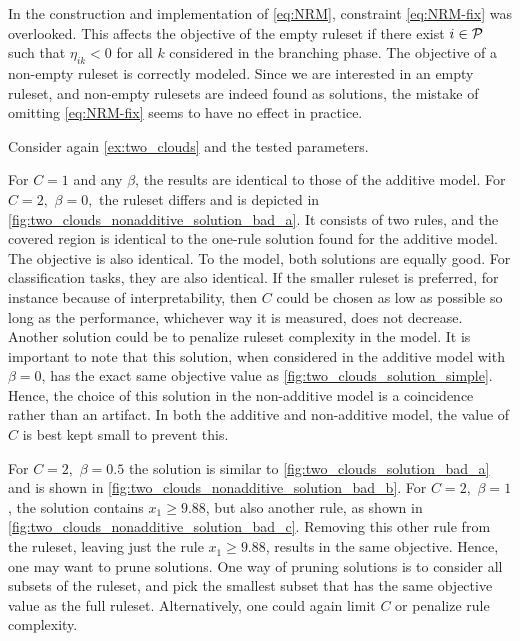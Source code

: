 \begin{note}
    In the construction and implementation of \eqref{eq:NRM}, constraint \eqref{eq:NRM-fix} was overlooked.
    This affects the objective of the empty ruleset if there exist $i \in \P$ such that $\eta_{ik} < 0$ for all
    $k$ considered in the branching phase.
    The objective of a non-empty ruleset is correctly modeled.
    Since we are interested in an empty ruleset, and non-empty rulesets are indeed found as solutions,
    the mistake of omitting \eqref{eq:NRM-fix} seems to have no effect in practice.
\end{note}

\begin{example}\label{ex:two_clouds_nonadditive}
    Consider again \autoref{ex:two_clouds} and the tested parameters.

    For $C=1$ and any $\beta$, the results are identical to those of the additive model.
    For $C=2,$ $\beta=0,$ the ruleset differs and is depicted in \autoref{fig:two_clouds_nonadditive_solution_bad_a}.
    It consists of two rules, and the covered region is identical to the one-rule solution found for the additive model.
    The objective is also identical.
    To the model, both solutions are equally good.
    For classification tasks, they are also identical.
    If the smaller ruleset is preferred, for instance because of interpretability, then $C$ could be chosen as low as possible so long as the performance,
    whichever way it is measured, does not decrease.
    Another solution could be to penalize ruleset complexity in the model.
    It is important to note that this solution, when considered in the additive model with $\beta =0$,
    has the exact same objective value as \autoref{fig:two_clouds_solution_simple}.
    Hence, the choice of this solution in the non-additive model is a coincidence rather than an artifact.
    In both the additive and non-additive model, the value of $C$ is best kept small to prevent this.

    For $C=2,$ $\beta=0.5$ the solution is similar to \autoref{fig:two_clouds_solution_bad_a} and is shown in \autoref{fig:two_clouds_nonadditive_solution_bad_b}.
    For $C=2,$ $\beta=1$, the solution contains $x_1 \geq 9.88$, but also another rule, as shown in \autoref{fig:two_clouds_nonadditive_solution_bad_c}.
    Removing this other rule from the ruleset, leaving just the rule $x_1 \geq 9.88$, results in the same objective.
    Hence, one may want to prune solutions.
    One way of pruning solutions is to consider all subsets of the ruleset, and pick the smallest subset that has the same objective value as the full ruleset.
    Alternatively, one could again limit $C$ or penalize rule complexity.


\end{example}
